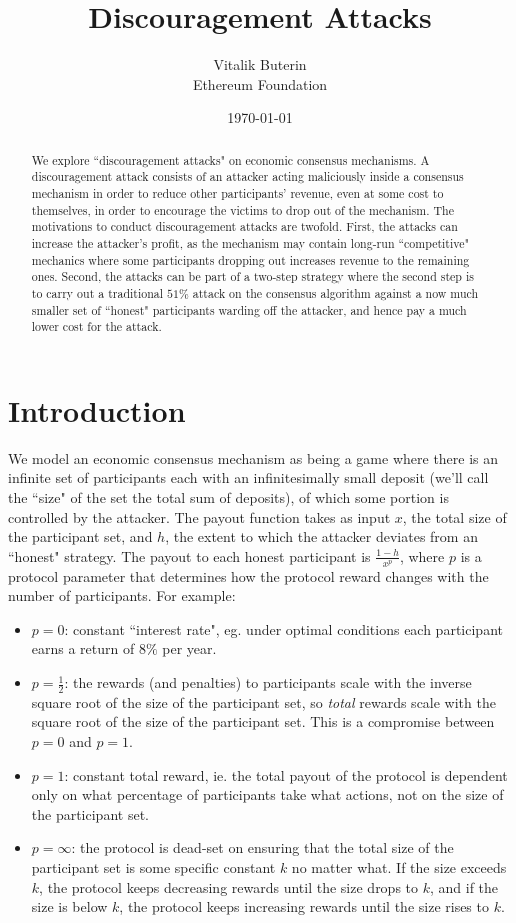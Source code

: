 \documentclass[12pt]{article}
\title{Discouragement Attacks}
\author{
        Vitalik Buterin \\
        Ethereum Foundation
}
\date{\today}
\begin{document}
\maketitle
\begin{abstract}
We explore ``discouragement attacks" on economic consensus mechanisms. A discouragement attack consists of an attacker acting maliciously inside a consensus mechanism in order to reduce other participants' revenue, even at some cost to themselves, in order to encourage the victims to drop out of the mechanism. The motivations to conduct discouragement attacks are twofold. First, the attacks can increase the attacker's profit, as the mechanism may contain long-run ``competitive" mechanics where some participants dropping out increases revenue to the remaining ones. Second, the attacks can be part of a two-step strategy where the second step is to carry out a traditional $51\%$ attack on the consensus algorithm against a now much smaller set of ``honest" participants warding off the attacker, and hence pay a much lower cost for the attack.
\end{abstract}

\section{Introduction}
We model an economic consensus mechanism as being a game where there is an infinite set of participants each with an infinitesimally small deposit (we'll call the ``size" of the set the total sum of deposits), of which some portion is controlled by the attacker. The payout function takes as input $x$, the total size of the participant set, and $h$, the extent to which the attacker deviates from an ``honest" strategy. The payout to each honest participant is $\frac{1-h}{x^p}$, where $p$ is a protocol parameter that determines how the protocol reward changes with the number of participants. For example:

\begin{itemize}
\item $p=0$: constant ``interest rate", eg. under optimal conditions each participant earns a return of $8\%$ per year.
\item $p=\frac{1}{2}$: the rewards (and penalties) to participants scale with the inverse square root of the size of the participant set, so \textit{total} rewards scale with the square root of the size of the participant set. This is a compromise between $p=0$ and $p=1$. 
\item $p=1$: constant total reward, ie. the total payout of the protocol is dependent only on what percentage of participants take what actions, not on the size of the participant set. 
\item $p=\infty$: the protocol is dead-set on ensuring that the total size of the participant set is some specific constant $k$ no matter what. If the size exceeds $k$, the protocol keeps decreasing rewards until the size drops to $k$, and if the size is below $k$, the protocol keeps increasing rewards until the size rises to $k$.
\end{itemize}
\end{document}

